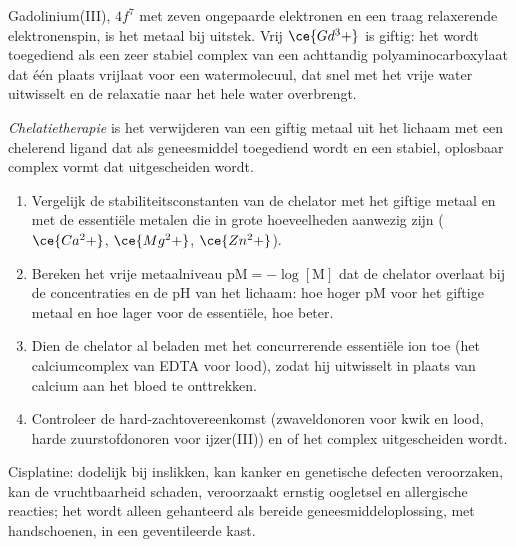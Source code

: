 Gadolinium(III), $4f^7$ met zeven ongepaarde elektronen en een traag
relaxerende elektronenspin, is het metaal bij uitstek. Vrij $\ce{Gd^3+}$ is giftig: het wordt toegediend als een
zeer stabiel complex van een achttandig polyaminocarboxylaat dat één
plaats vrijlaat voor een watermolecuul, dat snel met het vrije water
uitwisselt en de relaxatie naar het hele water overbrengt.

\begin{definition}[Chelatietherapie]\label{def:b3:bioinorganic:chelation-therapy}
\emph{Chelatietherapie} is het verwijderen van een
giftig metaal uit het lichaam met een chelerend ligand dat als
geneesmiddel toegediend wordt en een stabiel, oplosbaar complex vormt dat
uitgescheiden wordt.
\end{definition}

\begin{method}\label{met:b3:bioinorganic:choose-chelator}
\begin{enumerate}
  \item Vergelijk de stabiliteitsconstanten van de chelator met het giftige
        metaal en met de essentiële metalen die in grote hoeveelheden
        aanwezig zijn ($\ce{Ca^2+}$, $\ce{Mg^2+}$,
        $\ce{Zn^2+}$).
  \item Bereken het vrije metaalniveau $\mathrm{pM} = -\log[\mathrm M]$ dat de chelator overlaat bij de
        concentraties en de pH van het lichaam: hoe hoger pM voor het
        giftige metaal en hoe lager voor de essentiële, hoe beter.
  \item Dien de chelator al beladen met het concurrerende essentiële ion
        toe (het calciumcomplex van EDTA voor lood), zodat hij uitwisselt
        in plaats van calcium aan het bloed te onttrekken.
  \item Controleer de hard-zachtovereenkomst (zwaveldonoren voor kwik en
        lood, harde zuurstofdonoren voor ijzer(III)) en of het complex
        uitgescheiden wordt.
\end{enumerate}
\end{method}

\begin{safety}{}
Cisplatine: dodelijk bij inslikken, kan kanker en genetische defecten
veroorzaken, kan de vruchtbaarheid schaden, veroorzaakt ernstig
oogletsel en allergische reacties; het wordt alleen gehanteerd als
bereide geneesmiddeloplossing, met handschoenen, in een geventileerde
kast.
\end{safety}

